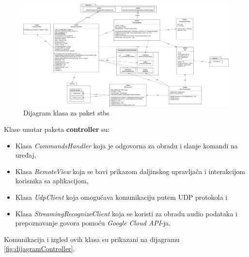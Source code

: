 \documentclass[implementacija.tex]{subfiles}
\begin{document}
\begin{figure}
    \centering
    \includegraphics[width=\textheight]{Implementacija/dijagrami/stbs_pakage_class_diagram.jpg}
    \caption{Dijagram klasa za paket stbs}
    \label{fig:dijagramStbs}
\end{figure}

Klase unutar paketa \textbf{controller} su:
\begin{itemize}
\item Klasa \textit{CommandsHandler} koja je odgovorna za obradu i slanje komandi na uređaj,
\item Klasa \textit{RemoteView} koja se bavi prikazom daljinskog upravljača i interakcijom korisnika sa aplikacijom,
\item Klasa \textit{UdpClient} koja omogućava komunikaciju putem UDP protokola i
\item Klasa \textit{StreamingRecognizeClient} koja se koristi za obradu audio podataka i prepoznavanje govora pomoću \textit{Google Cloud API}-ja. 
\end{itemize}
Komunikacija i izgled ovih klasa su prikazani na dijagramu \ref{fig:dijagramController}.
\end{document}
